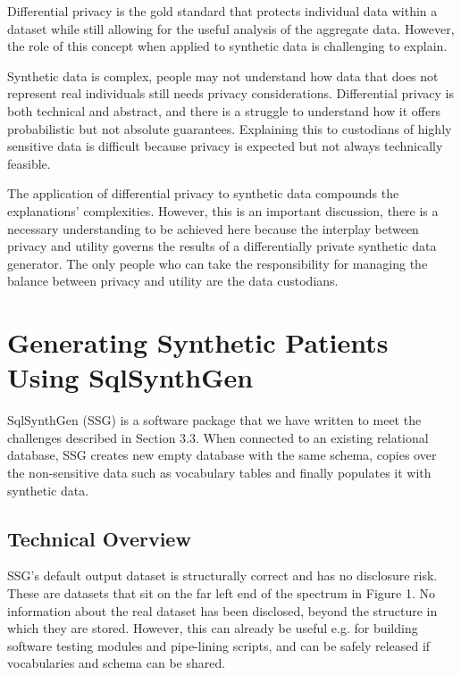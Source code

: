 \documentclass[11pt]{article}
\begin{document}

Differential privacy is the gold standard that protects individual data within a dataset while still allowing for the useful analysis of the aggregate data. However, the role of this concept when applied to synthetic data is challenging to explain. 

Synthetic data is complex, people may not understand how data that does not represent real individuals still needs privacy considerations. Differential privacy is both technical and abstract, and there is a struggle to understand how it offers probabilistic but not absolute guarantees. Explaining this to custodians of highly sensitive data is difficult because privacy is expected but not always technically feasible.


The application of differential privacy to synthetic data compounds the explanations' complexities. However, this is an important discussion, there is a necessary understanding to be achieved here because the interplay between privacy and utility governs the results of a differentially private synthetic data generator. The only people who can take the responsibility for managing the balance between privacy and utility are the data custodians.

 
\section{Generating Synthetic Patients Using SqlSynthGen}

SqlSynthGen (SSG) is a software package that we have written to meet the challenges described in Section 3.3. When connected to an existing relational database, SSG creates new empty database with the same schema, copies over the non-sensitive data such as vocabulary tables and finally populates it with synthetic data. 

\subsection{Technical Overview}

SSG's default output dataset is structurally correct and has no disclosure risk. These are datasets that sit on the far left end of the spectrum in Figure 1. No information about the real dataset has been disclosed, beyond the structure in which they are stored. However, this can already be useful e.g. for building software testing modules and pipe-lining scripts, and can be safely released if vocabularies and schema can be shared.
\end{document}
